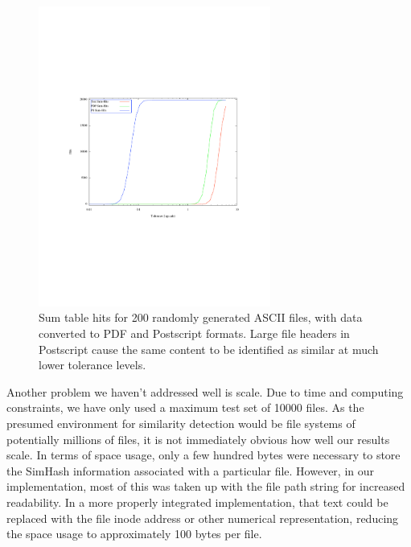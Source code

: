 \documentclass[10pt, twocolumn]{article}
\begin{document}
 \begin{figure}[t] 
 \centering
\includegraphics[width= 3in]{fileFormats.pdf}
\caption{Sum table hits for 200 randomly generated ASCII files, with data converted to PDF and Postscript formats.  Large file headers in Postscript cause the same content to be identified as similar at much lower tolerance levels.}
\label{headerFiles}
\end{figure}

Another problem we haven't addressed well is scale.  Due to time and computing constraints, we have only used a maximum test set of 10000 files.  As the presumed environment for similarity detection would be file systems of potentially millions of files, it is not immediately obvious how well our results scale.  In terms of space usage, only a few hundred bytes were necessary to store the SimHash information associated with a particular file. However, in our implementation, most of this was taken up with the file path string for increased readability.  In a more properly integrated implementation, that text could be replaced with the file inode address or other numerical representation, reducing the space usage to approximately 100 bytes per file.
\end{document}
